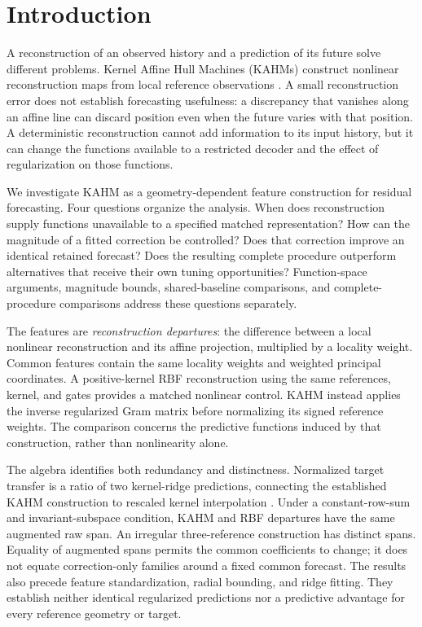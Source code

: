 \section{Introduction}\label{sec:introduction}

A reconstruction of an observed history and a prediction of its future
solve different problems. Kernel Affine Hull Machines (KAHMs) construct
nonlinear reconstruction maps from local reference observations
\citep{Kumar2024KAHM}. A small reconstruction error does not establish
forecasting usefulness: a discrepancy that vanishes along an affine line
can discard position even when the future varies with that position.
A deterministic reconstruction cannot add information to its input
history, but it can change the functions available to a restricted
decoder and the effect of regularization on those functions.

We investigate KAHM as a geometry-dependent feature construction for
residual forecasting. Four questions organize the analysis. When does
reconstruction supply functions unavailable to a specified matched
representation? How can the magnitude of a fitted correction be
controlled? Does that correction improve an identical retained
forecast? Does the resulting complete procedure outperform alternatives
that receive their own tuning opportunities? Function-space arguments,
magnitude bounds, shared-baseline comparisons, and complete-procedure
comparisons address these questions separately.

The features are \emph{reconstruction departures}: the difference
between a local nonlinear reconstruction and its affine projection,
multiplied by a locality weight. Common features contain the same
locality weights and weighted principal coordinates. A positive-kernel
RBF reconstruction using the same references, kernel, and gates provides
a matched nonlinear control. KAHM instead applies the inverse
regularized Gram matrix before normalizing its signed reference
weights. The comparison concerns the predictive functions induced by
that construction, rather than nonlinearity alone.

The algebra identifies both redundancy and distinctness. Normalized
target transfer is a ratio of two kernel-ridge predictions, connecting
the established KAHM construction to rescaled kernel interpolation
\citep{Deparis2014Rescaled,DeMarchi2017Rescaled}. Under a constant-row-sum
and invariant-subspace condition, KAHM and RBF departures have the same
augmented raw span. An irregular three-reference construction has
distinct spans. Equality of augmented spans permits the common
coefficients to change; it does not equate correction-only families
around a fixed common forecast. The results also precede feature
standardization, radial bounding, and ridge fitting. They establish
neither identical regularized predictions nor a predictive advantage
for every reference geometry or target.


